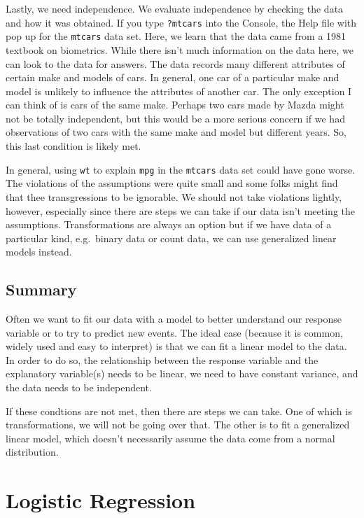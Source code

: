 \documentclass[
]{book}
\begin{document}
Lastly, we need independence. We evaluate independence by checking the data and how it was obtained. If you type \texttt{?mtcars} into the Console, the Help file with pop up for the \texttt{mtcars} data set. Here, we learn that the data came from a 1981 textbook on biometrics. While there isn't much information on the data here, we can look to the data for answers. The data records many different attributes of certain make and models of cars. In general, one car of a particular make and model is unlikely to influence the attributes of another car. The only exception I can think of is cars of the same make. Perhaps two cars made by Mazda might not be totally independent, but this would be a more serious concern if we had observations of two cars with the same make and model but different years. So, this last condition is likely met.

In general, using \texttt{wt} to explain \texttt{mpg} in the \texttt{mtcars} data set could have gone worse. The violations of the assumptions were quite small and some folks might find that thee transgressions to be ignorable. We should not take violations lightly, however, especially since there are steps we can take if our data isn't meeting the assumptions. Transformations are always an option but if we have data of a particular kind, e.g.~binary data or count data, we can use generalized linear models instead.

\hypertarget{summary}{%
\section{Summary}\label{summary}}

Often we want to fit our data with a model to better understand our response variable or to try to predict new events. The ideal case (because it is common, widely used and easy to interpret) is that we can fit a linear model to the data. In order to do so, the relationship between the response variable and the explanatory variable(s) needs to be linear, we need to have constant variance, and the data needs to be independent.

If these condtions are not met, then there are steps we can take. One of which is transformations, we will not be going over that. The other is to fit a generalized linear model, which doesn't necessarily assume the data come from a normal distribution.

\hypertarget{logistic-regression}{%
\chapter{Logistic Regression}\label{logistic-regression}}
\end{document}

